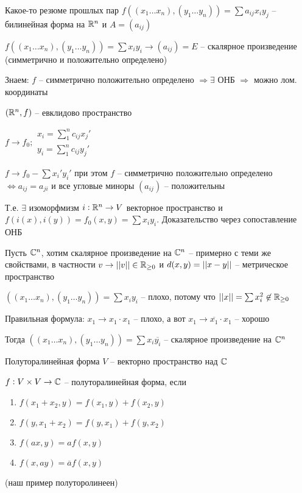 \documentclass[12pt]{article}
\begin{document}
\begin{nota}{Какое-то резюме прошлых пар}
    $f((x_1 \ldots x_n), (y_1 \ldots y_n)) = \sum a_{ij}x_iy_j$ -- билинейная форма на $\mathbb R^n$ и $A = (a_{ij})$

    $f((x_1 \ldots x_n), (y_1 \ldots y_n)) = \sum x_iy_i \to (a_{ij}) = E$ -- скалярное произведение (симметрично и положительно определено)

    Знаем: $f$ -- симметрично положительно определено $\Rightarrow \exists$ ОНБ $\Rightarrow$ можно лом. координаты 

    $(\mathbb R^n, f)$ -- евклидово пространство 

    $f \to f_0; \begin{gathered}
        x_i = \sum\limits_1^n c_{ij}x_j' \\
        y_i = \sum\limits_1^n c_{ij}y_j'
    \end{gathered}$

    $f \to f_0 - \sum x_i'y_i'$ при этом $f$ -- симметрично положительно определено $\Leftrightarrow a_{ij} = a_{ji}$ и все угловые миноры $(a_{ij})$ -- положительны

    Т.е. $\exists$ изоморфмизм $i : \mathbb R^n \to V$ векторное пространство и $f(i(x), i(y)) = f_0(x, y) = \sum x_iy_i$. Доказательство через сопоставление ОНБ 
\end{nota}

Пусть $\mathbb C^n$, хотим скалярное произведение на $\mathbb C^n$ -- примерно с теми же свойствами, в частности $v \to || v || \in \mathbb R_{\geq 0}$ и $d(x, y) = || x - y ||$ -- метрическое пространство 

$((x_1 \ldots x_n), (y_1 \ldots y_n)) = \sum x_iy_i$ -- плохо, потому что $|| x || = \sum x_i^2 \not\in \mathbb R_{\geq 0}$

Правильная формула: $x_1 \to x_1 \cdot x_1$ -- плохо, а вот $x_1 \to \overline{x_1} \cdot x_1$ -- хорошо

Тогда $((x_1 \ldots x_n), (y_1 \ldots y_n)) = \sum x_i\overline{y_i}$ -- скалярное произведение на $\mathbb C^n$

\begin{defin}{Полуторалинейная форма}
    $V$ -- векторно пространство над $\mathbb C$

    $f : V \times V \to \mathbb C$ -- полуторалинейная форма, если 

    \begin{enumerate}
        \item $f(x_1 + x_2, y) = f(x_1, y) + f(x_2, y)$
        \item $f(y, x_1 + x_2) = f(y, x_1) + f(y, x_2)$
        \item $f(ax, y) = af(x, y)$
        \item $f(x, ay) = \overline{a}f(x, y)$
    \end{enumerate}

    (наш пример полуторолинеен)
\end{defin}
\end{document}
